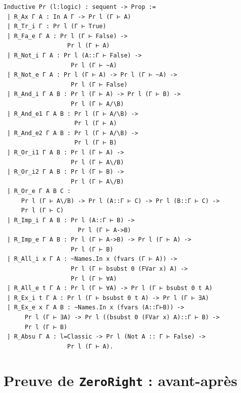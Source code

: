 \documentclass[a4paper]{article}
\begin{document}
\begin{verbatim}
Inductive Pr (l:logic) : sequent -> Prop :=
 | R_Ax Γ A : In A Γ -> Pr l (Γ ⊢ A)
 | R_Tr_i Γ : Pr l (Γ ⊢ True)
 | R_Fa_e Γ A : Pr l (Γ ⊢ False) ->
                  Pr l (Γ ⊢ A)
 | R_Not_i Γ A : Pr l (A::Γ ⊢ False) ->
                   Pr l (Γ ⊢ ~A)
 | R_Not_e Γ A : Pr l (Γ ⊢ A) -> Pr l (Γ ⊢ ~A) ->
                   Pr l (Γ ⊢ False)
 | R_And_i Γ A B : Pr l (Γ ⊢ A) -> Pr l (Γ ⊢ B) ->
                   Pr l (Γ ⊢ A/\B)
 | R_And_e1 Γ A B : Pr l (Γ ⊢ A/\B) ->
                    Pr l (Γ ⊢ A)
 | R_And_e2 Γ A B : Pr l (Γ ⊢ A/\B) ->
                    Pr l (Γ ⊢ B)
 | R_Or_i1 Γ A B : Pr l (Γ ⊢ A) ->
                   Pr l (Γ ⊢ A\/B)
 | R_Or_i2 Γ A B : Pr l (Γ ⊢ B) ->
                   Pr l (Γ ⊢ A\/B)
 | R_Or_e Γ A B C :
     Pr l (Γ ⊢ A\/B) -> Pr l (A::Γ ⊢ C) -> Pr l (B::Γ ⊢ C) ->
     Pr l (Γ ⊢ C)
 | R_Imp_i Γ A B : Pr l (A::Γ ⊢ B) ->
                     Pr l (Γ ⊢ A->B)
 | R_Imp_e Γ A B : Pr l (Γ ⊢ A->B) -> Pr l (Γ ⊢ A) ->
                   Pr l (Γ ⊢ B)
 | R_All_i x Γ A : ~Names.In x (fvars (Γ ⊢ A)) ->
                   Pr l (Γ ⊢ bsubst 0 (FVar x) A) ->
                   Pr l (Γ ⊢ ∀A)
 | R_All_e t Γ A : Pr l (Γ ⊢ ∀A) -> Pr l (Γ ⊢ bsubst 0 t A)
 | R_Ex_i t Γ A : Pr l (Γ ⊢ bsubst 0 t A) -> Pr l (Γ ⊢ ∃A)
 | R_Ex_e x Γ A B : ~Names.In x (fvars (A::Γ⊢B)) ->
      Pr l (Γ ⊢ ∃A) -> Pr l ((bsubst 0 (FVar x) A)::Γ ⊢ B) ->
      Pr l (Γ ⊢ B)
 | R_Absu Γ A : l=Classic -> Pr l (Not A :: Γ ⊢ False) ->
                  Pr l (Γ ⊢ A).
\end{verbatim}

\section{Preuve de \texttt{ZeroRight} : avant-après}\label{beforeafter_zeroright}
\end{document}

